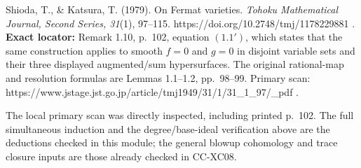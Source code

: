 Shioda, T., \& Katsura, T. (1979). On Fermat varieties. \emph{Tohoku
Mathematical Journal, Second Series, 31}(1), 97--115.
https://doi.org/10.2748/tmj/1178229881 . \textbf{Exact locator:} Remark
1.10, p.~102, equation \((1.1')\), which states that the same
construction applies to smooth \(f=0\) and \(g=0\) in disjoint variable
sets and their three displayed augmented/sum hypersurfaces. The original
rational-map and resolution formulas are Lemmas 1.1--1.2, pp.~98--99.
Primary scan:
https://www.jstage.jst.go.jp/article/tmj1949/31/1/31\_1\_97/\_pdf .

The local primary scan was directly inspected, including printed p.~102.
The full simultaneous induction and the degree/base-ideal verification
above are the deductions checked in this module; the general blowup
cohomology and trace closure inputs are those already checked in
CC-XC08.
